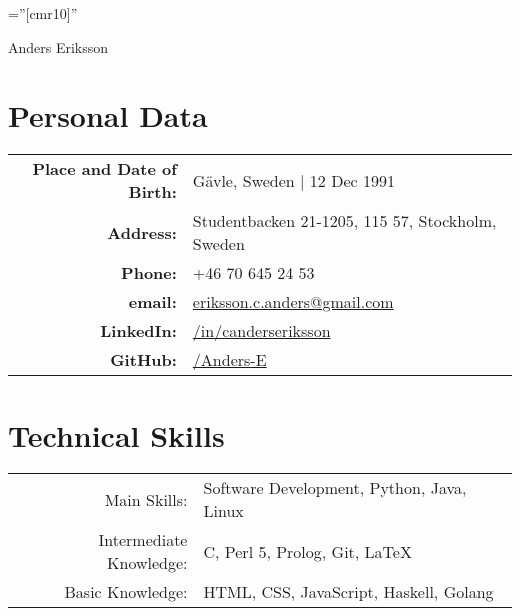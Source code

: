 \documentclass[a4paper,10pt]{article}
\begin{document}
\pagestyle{empty} %

\font\fb=''[cmr10]'' %

\par{\centering
		{\Huge Anders Eriksson
	}\bigskip\par}

\section{Personal Data}

\begin{tabular}{rl}
    \textbf{Place and Date of Birth:} & G{\"a}vle, Sweden  | 12 Dec 1991 \\
    \textbf{Address:}   & Studentbacken 21-1205, 115 57, Stockholm, Sweden \\
    \textbf{Phone:}     & +46 70 645 24 53\\
    \textbf{email:}     & \href{mailto:eriksson.c.anders@gmail.com
}{eriksson.c.anders@gmail.com}\\
    \textbf{LinkedIn:}	& \href{http://se.linkedin.com/in/canderseriksson}{/in/canderseriksson}\\
    \textbf{GitHub:}	& \href{http://github.com/Anders-E}{/Anders-E}
\end{tabular}

\section{Technical Skills}
\begin{tabular}{rl}
Main Skills:& Software Development, Python, Java, Linux \\
Intermediate Knowledge:& C, Perl 5, Prolog, Git, \LaTeX\\
Basic Knowledge:& HTML, CSS, JavaScript, Haskell, Golang \\
\end{tabular}
\end{document}
